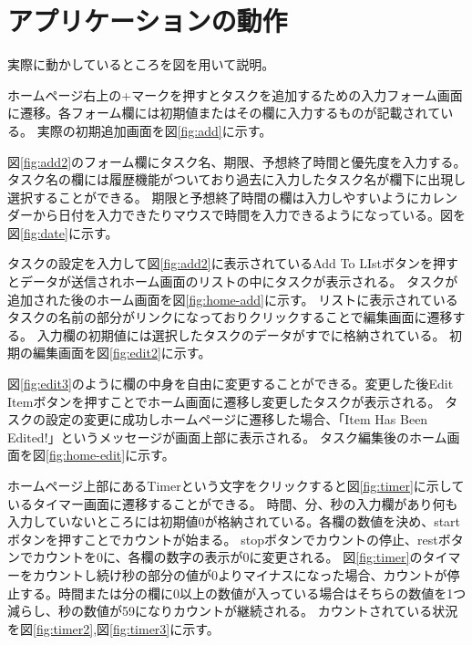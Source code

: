 \chapter{アプリケーションの動作}
\label{cha:motion}

実際に動かしているところを図を用いて説明。

ホームページ右上の+マークを押すとタスクを追加するための入力フォーム画面に遷移。各フォーム欄には初期値またはその欄に入力するものが記載されている。
実際の初期追加画面を図\ref{fig:add}に示す。


図\ref{fig:add2}のフォーム欄にタスク名、期限、予想終了時間と優先度を入力する。タスク名の欄には履歴機能がついており過去に入力したタスク名が欄下に出現し選択することができる。
期限と予想終了時間の欄は入力しやすいようにカレンダーから日付を入力できたりマウスで時間を入力できるようになっている。図を図\ref{fig:date}に示す。



タスクの設定を入力して図\ref{fig:add2}に表示されているAdd To LIstボタンを押すとデータが送信されホーム画面のリストの中にタスクが表示される。
タスクが追加された後のホーム画面を図\ref{fig:home-add}に示す。
リストに表示されているタスクの名前の部分がリンクになっておりクリックすることで編集画面に遷移する。
入力欄の初期値には選択したタスクのデータがすでに格納されている。
初期の編集画面を図\ref{fig:edit2}に示す。


図\ref{fig:edit3}のように欄の中身を自由に変更することができる。変更した後Edit Itemボタンを押すことでホーム画面に遷移し変更したタスクが表示される。
タスクの設定の変更に成功しホームページに遷移した場合、「Item Has Been Edited!」というメッセージが画面上部に表示される。
タスク編集後のホーム画面を図\ref{fig:home-edit}に示す。


ホームページ上部にあるTimerという文字をクリックすると図\ref{fig:timer}に示しているタイマー画面に遷移することができる。
時間、分、秒の入力欄があり何も入力していないところには初期値0が格納されている。各欄の数値を決め、startボタンを押すことでカウントが始まる。
stopボタンでカウントの停止、restボタンでカウントを0に、各欄の数字の表示が0に変更される。
図\ref{fig:timer}のタイマーをカウントし続け秒の部分の値が0よりマイナスになった場合、カウントが停止する。時間または分の欄に0以上の数値が入っている場合はそちらの数値を1つ減らし、秒の数値が59になりカウントが継続される。
カウントされている状況を図\ref{fig:timer2},図\ref{fig:timer3}に示す。
